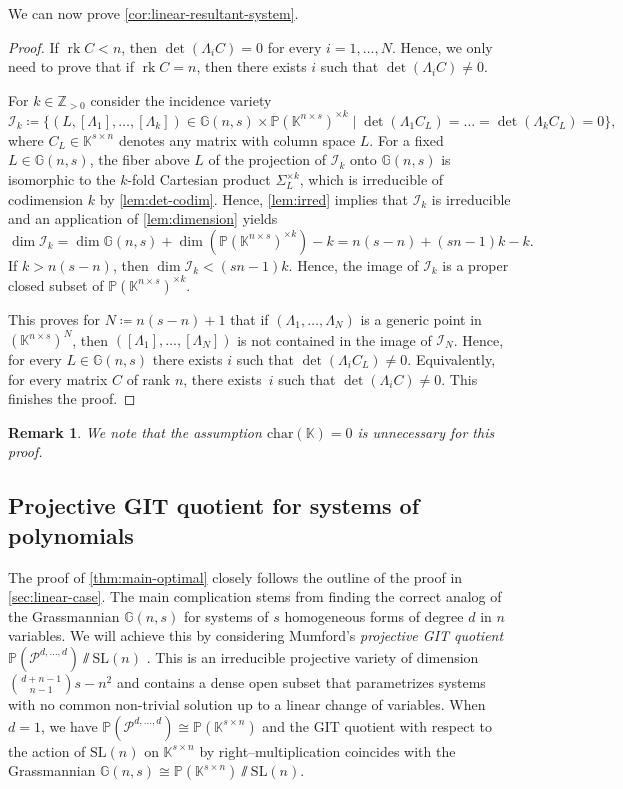 \documentclass[11pt,a4paper]{article}
\newtheorem{remark}[theorem]{Remark}\AddToHook{env/remark/begin}{\crefalias{theorem}{remark}}
\numberwithin{equation}{section}
\newcommand{\PP}{\mathbb{P}}
\newcommand{\GG}{\mathbb{G}}
\newcommand{\ZZ}{\mathbb{Z}}
\newcommand{\KK}{\mathbb{K}}
\newcommand{\cP}{\mathcal{P}}
\newcommand{\cI}{\mathcal{I}}
\newcommand{\SL}{\mathrm{SL}}
\DeclareMathOperator{\rk}{rk}
\begin{document}
We can now prove \cref{cor:linear-resultant-system}.

\linearcor*

\begin{proof}
If $\rk C<n$, then $\det(\Lambda_i C)=0$ for every $i=1,\dots,N$.
Hence, we only need to prove that if $\rk C=n$, then there exists $i$ such that $\det(\Lambda_i C)\neq 0$.

For $k\in\ZZ_{>0}$ consider the incidence variety \[
    \cI_k \coloneqq \{(L,[\Lambda_1],\dots,[\Lambda_k])\in \GG(n,s)\times\PP(\KK^{n\times s})^{\times k}\mid \det(\Lambda_1 C_L)=\dots=\det(\Lambda_k C_L)=0\},
    \] where $C_L\in\KK^{s\times n}$ denotes any matrix with column space $L$.
    For a fixed $L\in\GG(n,s)$, the fiber above $L$ of the projection of $\cI_k$ onto $\GG(n,s)$ is isomorphic to the $k$-fold Cartesian product $\Sigma_L^{\times k}$, which is irreducible of codimension $k$ by \cref{lem:det-codim}. 
    Hence, \cref{lem:irred} implies that $\cI_k$ is irreducible and an application of
    \cref{lem:dimension} yields \[
    \dim\cI_k = \dim\GG(n,s)+\dim\left(\PP(\KK^{n\times s})^{\times k}\right)-k = n(s-n)+(sn-1)k-k.
    \] If $k> n(s-n)$, then $\dim\cI_k<(sn-1)k$.
    Hence, the image of $\cI_k$ is a proper closed subset of $\PP(\KK^{n\times s})^{\times k}$.

    This proves for $N\coloneqq n(s-n)+1$ that if $(\Lambda_1,\dots,\Lambda_N)$ is a generic point in $(\KK^{n\times s})^N$, then $([\Lambda_1],\dots,[\Lambda_N])$ is not contained in the image of $\cI_N$.
    Hence, for every $L\in\GG(n,s)$ there exists $i$ such that $\det(\Lambda_i C_L)\neq 0$. 
    Equivalently, for every matrix $C$ of rank $n$, there exists~$i$ such that $\det(\Lambda_i C)\neq 0$.
    This finishes the proof.
\end{proof}

\begin{remark}
    We note that the assumption $\mathrm{char}(\KK)=0$ is unnecessary for this proof.
\end{remark}

\subsection{Projective GIT quotient for systems of polynomials}
\label{sec:git}
The proof of \cref{thm:main-optimal} closely follows the outline of the proof in \cref{sec:linear-case}.
The main complication stems from finding the correct analog of the Grassmannian $\GG(n,s)$ for systems of $s$ homogeneous forms of degree $d$ in $n$ variables. 
We will achieve this by considering Mumford's \emph{projective GIT quotient} $\PP(\cP^{d,\dots,d})\sslash\SL(n)$ \cite{MFK-94}.
This is an irreducible projective variety of dimension $\binom{d+n-1}{n-1}s-n^2$ and contains a dense open subset that parametrizes systems with no common non-trivial solution up to a linear change of variables.
When $d=1$, we have $\PP(\cP^{d,\dots,d})\cong\PP(\KK^{s\times n})$ and the GIT quotient with respect to the action of $\SL(n)$ on $\KK^{s\times n}$ by right--multiplication coincides with the Grassmannian $\GG(n,s)\cong\PP(\KK^{s\times n})\sslash \SL(n)$.
\end{document}
